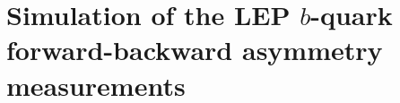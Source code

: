 \documentclass{moriond}
\begin{document}


\section{Simulation of the LEP $b$-quark forward-backward asymmetry measurements}
\label{sec:}
\end{document}
